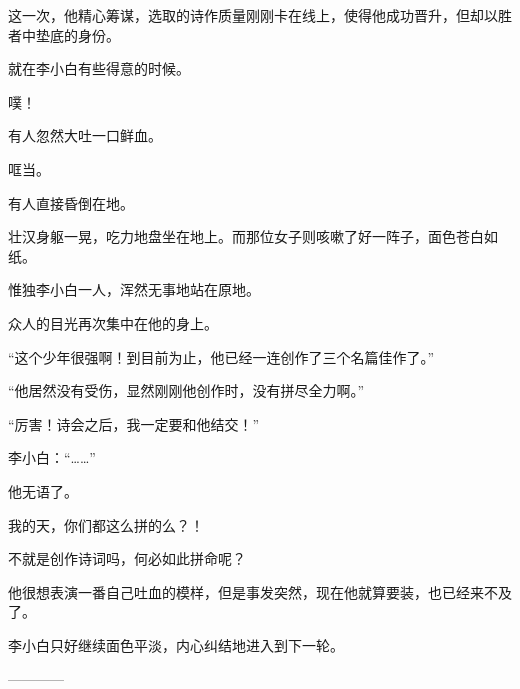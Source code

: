 \begin{this_body}
这一次，他精心筹谋，选取的诗作质量刚刚卡在线上，使得他成功晋升，但却以胜者中垫底的身份。

就在李小白有些得意的时候。

噗！

有人忽然大吐一口鲜血。

哐当。

有人直接昏倒在地。

壮汉身躯一晃，吃力地盘坐在地上。而那位女子则咳嗽了好一阵子，面色苍白如纸。

惟独李小白一人，浑然无事地站在原地。

众人的目光再次集中在他的身上。

“这个少年很强啊！到目前为止，他已经一连创作了三个名篇佳作了。”

“他居然没有受伤，显然刚刚他创作时，没有拼尽全力啊。”

“厉害！诗会之后，我一定要和他结交！”

李小白：“……”

他无语了。

我的天，你们都这么拼的么？！

不就是创作诗词吗，何必如此拼命呢？

他很想表演一番自己吐血的模样，但是事发突然，现在他就算要装，也已经来不及了。

李小白只好继续面色平淡，内心纠结地进入到下一轮。

------------

\end{this_body}

